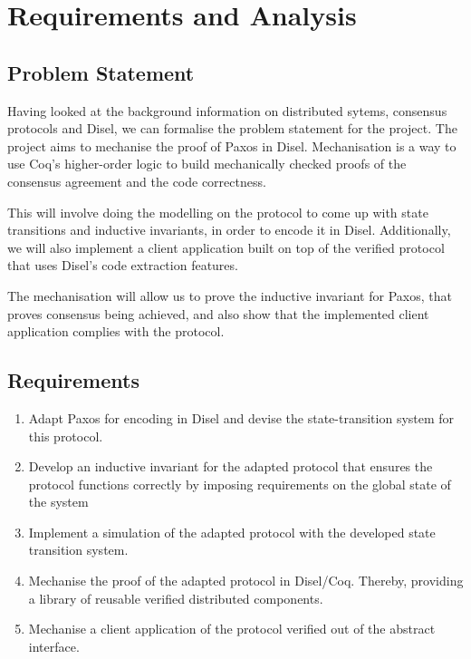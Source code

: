 \chapter{Requirements and Analysis}

\section{Problem Statement}
Having looked at the background information on distributed sytems, consensus protocols
and Disel, we can formalise the problem statement for the project.
The project aims to mechanise the proof of Paxos in
Disel. Mechanisation is a way to use Coq's higher-order logic to build mechanically
checked proofs of the consensus agreement and the code correctness.

This will involve doing the modelling on the protocol to come up with
state transitions and inductive invariants, in order to encode it in Disel.
Additionally, we will also implement a client application built on top
of the verified protocol that uses Disel's code extraction features.

The mechanisation will allow us to prove the inductive invariant for Paxos,
that proves consensus being achieved,
and also show that the implemented client application complies with the protocol.



\section{Requirements}
\begin{enumerate}
  \item Adapt Paxos for encoding in Disel and devise the state-transition system for this protocol.
  \item Develop an inductive invariant for the adapted protocol that
    ensures the protocol functions correctly by imposing requirements on the global state of the system
  \item Implement a simulation of the adapted protocol with the developed state transition system.
  \item Mechanise the proof of the adapted protocol in Disel/Coq.
    Thereby, providing a library of reusable verified distributed components.
  \item Mechanise a client application of the protocol verified out of the abstract interface.
\end{enumerate}

